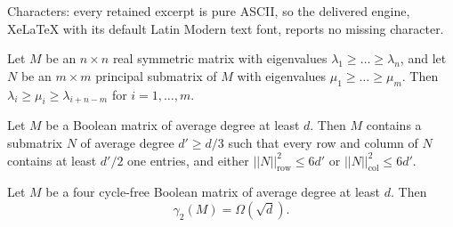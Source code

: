 \documentclass[10pt,a4paper]{amsart}
\DeclareMathOperator{\col}{col}
\DeclareMathOperator{\row}{row}
\begin{document}
Characters: every retained excerpt is pure ASCII, so the delivered engine, XeLaTeX with its default Latin Modern text font, reports no missing character.
\begin{lemma}\label{lemma:cauchy}
Let $M$ be an $n\times n$ real symmetric matrix with eigenvalues $\lambda_1\geq \dots\geq \lambda_n$, and let $N$ be an $m\times m$ principal submatrix of $M$ with eigenvalues $\mu_1\geq \dots\geq \mu_m$. Then $\lambda_i\geq \mu_i\geq \lambda_{i+n-m}$ for $i=1,\dots,m$.
\end{lemma}

\begin{lemma}\label{lemma:regularize}
Let $M$ be a Boolean matrix of average degree at least $d$. Then $M$ contains a submatrix $N$ of average degree $d'\geq d/3$ such that every row and column of $N$ contains at least $d'/2$ one entries, and either $||N||_{\row}^2\leq 6d'$ or $||N||_{\col}^2\leq 6d'$.
\end{lemma}

\begin{lemma}\label{lemma:C4-free}
Let $M$ be a four cycle-free Boolean matrix of average degree at least $d$. Then $$\gamma_2(M)=\Omega(\sqrt{d}).$$
\end{lemma}
\end{document}
